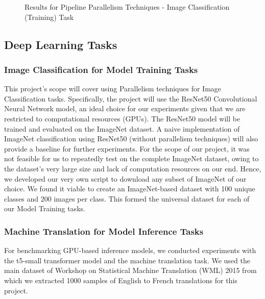 \documentclass[conference]{IEEEtran}
\begin{document}
\begin{figure}[t]
	\centering
	\caption{Results for Pipeline Parallelism Techniques - Image Classification (Training) Task}
	\label{fig}
\end{figure}

\subsection{Deep Learning Tasks}
\subsubsection{Image Classification for Model Training Tasks}
This project's scope will cover using Parallelism techniques for Image Classification tasks. Specifically, the project will use the ResNet50 Convolutional Neural Network model, an ideal choice for our experiments given that we are restricted to computational resources (GPUs). The ResNet50 model will be trained and evaluated on the ImageNet dataset. A naive implementation of ImageNet classification using ResNet50 (without parallelism techniques) will also provide a baseline for further experiments. For the scope of our project, it was not feasible for us to repeatedly test on the complete ImageNet dataset, owing to the dataset's very large size and lack of computation resources on our end. Hence, we developed our very own script to download any subset of ImageNet of our choice. We found it viable to create an ImageNet-based dataset with 100 unique classes and 200 images per class. This formed the universal dataset for each of our Model Training tasks.

\subsubsection{Machine Translation for Model Inference Tasks}
For benchmarking GPU-based inference models, we conducted experiments with the t5-small transformer model and the machine translation task. We used the main dataset of Workshop on Statistical Machine Translation (WML) 2015 from which we extracted 1000 samples of English to French translations for this project.
\end{document}
